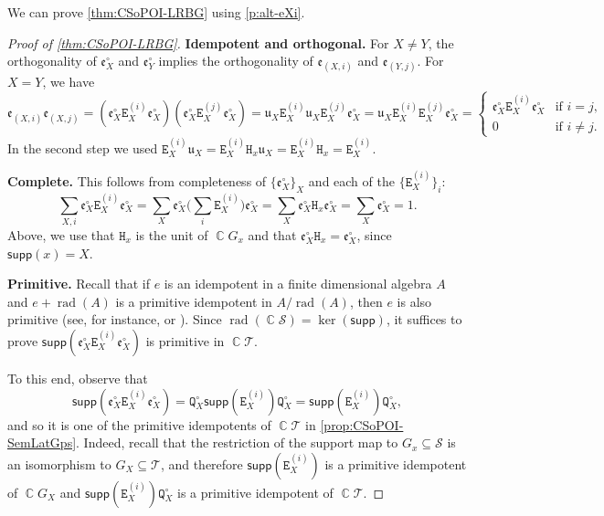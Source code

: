 \documentclass[11pt, oneside, reqno]{amsart}
\theoremstyle{definition}
\numberwithin{equation}{section}
\DeclareMathOperator{\C}{\mathbb{C}}
\def \SS{{\mathcal{S}}}
\def \TT{{\mathcal{T}}}
\def \kk{\C}
\def \uu{{\mathfrak{u}}}
\def \ee{{\mathfrak{e}}}
\def \supp{\mathsf{supp}}
\DeclareMathOperator{\rad}{rad} 		%
\newcommand{\B}[1]{\mathtt{#1}} 			%
\begin{document}
We can prove \cref{thm:CSoPOI-LRBG} using \cref{p:alt-eXi}.
\begin{proof}[Proof of \cref{thm:CSoPOI-LRBG}]
    \noindent\textbf{Idempotent and orthogonal.}
        For $X \neq Y$, the orthogonality of $\ee^\circ_X$ and $\ee^\circ_Y$ implies the orthogonality of $\ee_{(X,i)}$
        and $\ee_{(Y,j)}$.
        For $X = Y$, we have
        \[
            \ee_{(X,i)} \ee_{(X,j)} =
            (\ee^\circ_X \B{E}^{(i)}_X \ee^\circ_X) (\ee^\circ_X \B{E}^{(j)}_X \ee^\circ_X)
            = \uu_{X} \B{E}^{(i)}_X \uu_X \B{E}^{(j)}_X \ee^\circ_X
            = \uu_{X} \B{E}^{(i)}_X \B{E}^{(j)}_X \ee^\circ_X
            = \begin{cases}
                \ee^\circ_X \B{E}^{(i)}_X \ee^\circ_X   & \text{if } i = j,\\
                0                                   & \text{if } i \neq j.
            \end{cases}
        \]
        In the second step we used $\B{E}^{(i)}_X \uu_X = \B{E}^{(i)}_X \B{H}_x \uu_X = \B{E}^{(i)}_X \B{H}_x = \B{E}^{(i)}_X$.

    \medskip
    \noindent\textbf{Complete.}
        This follows from completeness of $\{ \ee^\circ_X \}_X$ and each of the $\{ \B{E}^{(i)}_X \}_i$:
        \[
            \sum_{X,i} \ee^\circ_X \B{E}^{(i)}_X \ee^\circ_X = \sum_X \ee^\circ_X \Big( \sum_i \B{E}^{(i)}_X \Big) \ee^\circ_X = \sum_X \ee^\circ_X \B{H}_x \ee^\circ_X = \sum_X \ee^\circ_X = 1.
        \]
        Above, we use that $\B{H}_x$ is the unit of $\kk G_x$ and that $\ee^\circ_X \B{H}_x = \ee^\circ_X$, since $\supp(x) = X$.

    \medskip
    \noindent\textbf{Primitive.}
        Recall that if $e$ is an idempotent in a finite dimensional algebra $A$ and
        $e + \rad(A)$ is a primitive idempotent in $A/\rad(A)$,
        then $e$ is also primitive
        (see, for instance, \cite[Lemma~D.28]{am17} or \cite[Corollary~1.7.4]{Benson1998:I}).
        Since $\rad(\kk \SS) = \ker(\supp)$,
        it suffices to prove $\supp(\ee^\circ_X \B{E}^{(i)}_X \ee^\circ_X)$
        is primitive in $\kk \TT$.

        To this end, observe that
        \[
            \supp(\ee^\circ_X \B{E}^{(i)}_X \ee^\circ_X) = 
            \B{Q}^\circ_X \supp(\B{E}^{(i)}_X) \B{Q}^\circ_X =
            \supp(\B{E}^{(i)}_X) \B{Q}^\circ_X,
        \]
        and so it
        is one of the primitive idempotents of $\kk \TT$ in \cref{prop:CSoPOI-SemLatGps}.
        Indeed, recall that the restriction of the support map to $G_x \subseteq \SS$ is an isomorphism to $G_X \subseteq \TT$, and therefore $\supp(\B{E}^{(i)}_X)$ is a primitive idempotent of $\kk G_X$ and $\supp(\B{E}^{(i)}_X) \B{Q}^\circ_X$ is a primitive idempotent of $\kk \TT$.
\end{proof}
\end{document}
